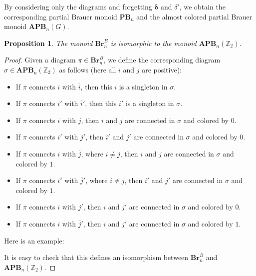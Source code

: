 \documentclass[a4paper]{amsart}
\newtheorem{proposition}[theorem]{Proposition}
\begin{document}
By considering only the diagrams and forgetting $\boldsymbol{\delta}$ and $\delta'$, we
obtain the corresponding partial Brauer monoid $\mathbf{PB}_n$ and the
almost colored partial Brauer monoid $\mathbf{APB}_n(G)$.

\begin{proposition}\label{prop4.4.65-1}
The monoid  $\mathbf{Br}_n^B$ is isomorphic to the monoid $\mathbf{APB}_n(\mathbb{Z}_2)$.
\end{proposition}

\begin{proof}
Given a diagram $\pi\in \mathbf{Br}_n^B$, we define the corresponding diagram
$\sigma\in \mathbf{APB}_n(\mathbb{Z}_2)$ as follows (here all $i$ and $j$ are positive):
\begin{itemize}
\item If $\pi$ connects $i$ with $\overline{i}$,
then this $i$ is a singleton in $\sigma$.
\item If $\pi$ connects $i'$ with $\overline{i}'$,
then this $i'$ is a singleton in $\sigma$.
\item If $\pi$ connects $i$ with $j$,
then $i$ and $j$ are connected in $\sigma$ and colored by $0$.
\item If $\pi$ connects $i'$ with ${j}'$,
then $i'$ and $j'$ are connected in $\sigma$ and colored by $0$.
\item If $\pi$ connects $i$ with $\overline{j}$, where $i\neq j$,
then $i$ and $j$ are connected in $\sigma$ and colored by $1$.
\item If $\pi$ connects $i'$ with $\overline{j}'$, where $i\neq j$,
then $i'$ and $j'$ are connected in $\sigma$ and colored by $1$.
\item If $\pi$ connects $i$ with $j'$,
then $i$ and $j'$ are connected in $\sigma$ and colored by $0$.
\item If $\pi$ connects $i$ with $\overline{j}'$,
then $i$ and $j'$ are connected in $\sigma$ and colored by $1$.
\end{itemize}
Here is an example:


It is easy to check that this defines an isomorphism between 
$\mathbf{Br}_n^B$ and $\mathbf{APB}_n(\mathbb{Z}_2)$. 
\end{proof}
\end{document}
